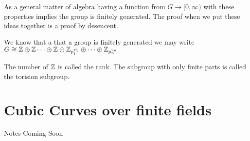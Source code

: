 \documentclass{article}
\begin{document}
As a general matter of algebra having a function from $G \to [0,\infty)$ with these properties implies the group is finitely generated.
The proof when we put these ideas together is a proof by desencent.

We know that a that a group is finitely generated we may write $G \cong \mathbb{Z} \oplus \mathbb{Z} \cdots \oplus \mathbb{Z} \oplus \mathbb{Z}_{p_1^{v_1}} \oplus \cdots \oplus \mathbb{Z}_{p_n^{v_n}}$

The number of $\mathbb{Z}$ is called the rank. The subgroup with only finite parts is called the torision subgroup. 

\section{Cubic Curves over finite fields}

Notes Coming Soon
\end{document}

